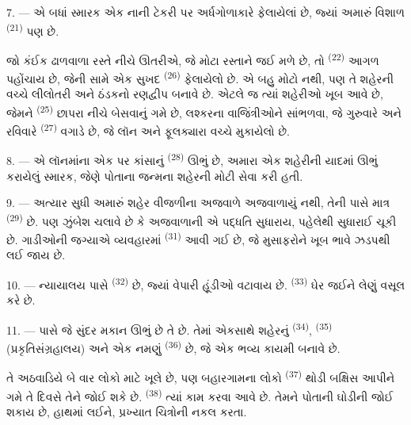 7. --- એ બધાં સ્મારક એક નાની ટેકરી પર અર્ધગોળાકારે ફેલાયેલાં છે, જ્યાં
અમારું વિશાળ  \textsuperscript{(21)} પણ છે.

જો કંઈક ઢાળવાળા રસ્તે નીચે ઊતરીએ, જે મોટા રસ્તાને જઈ મળે છે, તો
 \textsuperscript{(22)} આગળ પહોંચાય છે, જેની સામે એક
સુખદ  \textsuperscript{(26)} ફેલાયેલો છે. એ
 બહુ મોટો નથી, પણ તે શહેરની વચ્ચે લીલોતરી અને
ઠંડકનો રણદ્વીપ બનાવે છે. એટલે જ ત્યાં શહેરીઓ ખૂબ આવે છે, જેમને
 \textsuperscript{(25)} છાપરા નીચે બેસવાનું ગમે છે,
લશ્કરના વાજિંત્રીઓને સાંભળવા, જે ગુરુવારે અને રવિવારે
 \textsuperscript{(27)} વગાડે છે, જે લૉન અને
ફૂલક્યારા વચ્ચે મુકાયેલો છે.

8. --- એ લૉનમાંના એક પર કાંસાનું  \textsuperscript{(28)}
ઊભું છે, અમારા એક શહેરીની યાદમાં ઊભું કરાયેલું સ્મારક, જેણે પોતાના
જન્મના શહેરની મોટી સેવા કરી હતી.

\VUsaut{4.0mm}
\VUsaut{3.4mm}

9. --- અત્યાર સુધી અમારું શહેર વીજળીના અજવાળે અજવાળાયું નથી, તેની પાસે
માત્ર  \textsuperscript{(29)} છે. પણ  ઝુંબેશ ચલાવે છે કે અજવાળાની એ પદ્ધતિ સુધારાય, 
 પહેલેથી સુધારાઈ ચૂકી છે.
   ગાડીઓની જગ્યાએ
વ્યવહારમાં  \textsuperscript{(31)} આવી ગઈ છે, જે
મુસાફરોને  ખૂબ  ભાવે
ઝડપથી લઈ જાય છે.

10. --- ન્યાયાલય પાસે  \textsuperscript{(32)} છે, જ્યાં
વેપારી હૂંડીઓ વટાવાય છે. 
\textsuperscript{(33)} ઘેર જઈને લેણું વસૂલ કરે છે.

\VUsaut{4.0mm}
\VUsaut{3.4mm}

11. --- પાસે જે સુંદર મકાન ઊભું છે તે  છે. તેમાં
એકસાથે શહેરનું  \textsuperscript{(34)},
 \textsuperscript{(35)}
(પ્રકૃતિસંગ્રહાલય) અને એક નમણું 
\textsuperscript{(36)} છે, જે એક ભવ્ય કાયમી  બનાવે છે.

તે અઠવાડિયે બે વાર લોકો માટે ખૂલે છે, પણ બહારગામના લોકો
 \textsuperscript{(37)} થોડી બક્ષિસ આપીને ગમે તે
દિવસે તેને જોઈ શકે છે.  \textsuperscript{(38)}
ત્યાં કામ કરવા આવે છે. તેમને પોતાની ઘોડીની  જોઈ શકાય છે,
હાથમાં  લઈને, પ્રખ્યાત ચિત્રોની નકલ કરતા.

